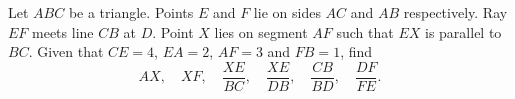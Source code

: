 Let $ABC$ be a triangle. Points $E$ and $F$ lie on sides $AC$ and $AB$ respectively. Ray $EF$ meets line $CB$ at $D$. Point $X$ lies on segment $AF$ such that $EX$ is parallel to $BC$. Given that $CE=4$, $EA=2$, $AF=3$ and $FB=1$, find
\[
AX,\quad XF,\quad \dfrac{XE}{BC},\quad \dfrac{XE}{DB},\quad \dfrac{CB}{BD},\quad \dfrac{DF}{FE}.
\]

